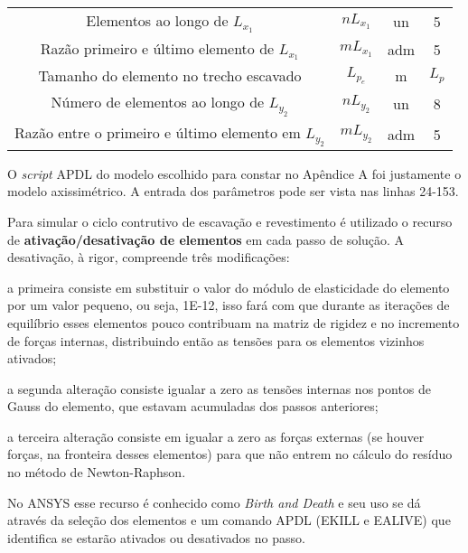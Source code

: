 \begin{table}[H]
\begin{tabular}{c c c c}
		Elementos ao longo de $L_{x_1}$ & $nL_{x_1}$ & un & 5 \\
		Razão primeiro e último elemento de $L_{x_1}$ & $mL_{x_1}$ & adm & 5 \\				
		Tamanho do elemento no trecho escavado & $L_{p_e}$ & m & $L_{p}$ \\	
		Número de elementos ao longo de $L_{y_2}$ & $nL_{y_2}$ & un & 8 \\			
		Razão entre o primeiro e último elemento em $L_{y_2}$ & $mL_{y_2}$ & adm & 5 \\				
		\hline
	\end{tabular}
	\normalsize
\end{table}

O \textit{script} APDL do modelo escolhido para constar no Apêndice A foi justamente o modelo axissimétrico. A entrada dos parâmetros pode ser vista nas linhas 24-153.

Para simular o ciclo contrutivo de escavação e revestimento é utilizado o recurso de \textbf{ativação/desativação de elementos} em cada passo de solução. A desativação, à rigor, compreende três modificações:
\begin{alineas}
	
	\item a primeira consiste em substituir o valor do módulo de elasticidade do elemento por um valor pequeno, ou seja, 1E-12, isso fará com que durante as iterações de equilíbrio esses elementos pouco contribuam na matriz de rigidez e no incremento de forças internas, distribuindo então as tensões para os elementos vizinhos ativados;
	
	\item a segunda alteração consiste igualar a zero as tensões internas nos pontos de Gauss do elemento, que estavam acumuladas dos passos anteriores; 
	
	\item a terceira alteração consiste em igualar a zero as forças externas (se houver forças, na fronteira desses elementos) para que não entrem no cálculo do resíduo no método de Newton-Raphson.
	
\end{alineas}

No ANSYS esse recurso é conhecido como \textit{Birth and Death} e seu uso se dá através da seleção dos elementos e um comando APDL (EKILL e EALIVE) que identifica se estarão ativados ou desativados no passo.


